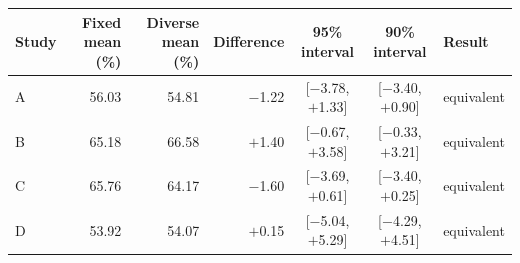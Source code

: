 \begin{tabular}{@{}lrrrccl@{}}
\toprule
Study & Fixed mean (\%) & Diverse mean (\%) & Difference & 95\% interval & 90\% interval & Result \\
\midrule
A & 56.03 & 54.81 & $-$1.22 & [$-$3.78, $+$1.33] & [$-$3.40, $+$0.90] & equivalent \\
B & 65.18 & 66.58 & $+$1.40 & [$-$0.67, $+$3.58] & [$-$0.33, $+$3.21] & equivalent \\
C & 65.76 & 64.17 & $-$1.60 & [$-$3.69, $+$0.61] & [$-$3.40, $+$0.25] & equivalent \\
D & 53.92 & 54.07 & $+$0.15 & [$-$5.04, $+$5.29] & [$-$4.29, $+$4.51] & equivalent \\
\bottomrule
\end{tabular}
